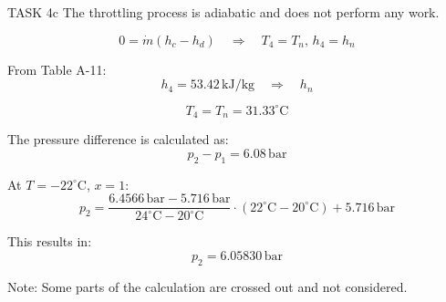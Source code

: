 TASK 4c  
The throttling process is adiabatic and does not perform any work.  

\[
0 = \dot{m} \left( h_c - h_d \right) \quad \Rightarrow \quad T_4 = T_n, \, h_4 = h_n
\]

From Table A-11:  
\[
h_4 = 53.42 \, \text{kJ/kg} \quad \Rightarrow \quad h_n
\]

\[
T_4 = T_n = 31.33^\circ\text{C}
\]

The pressure difference is calculated as:  
\[
p_2 - p_1 = 6.08 \, \text{bar}
\]

At \( T = -22^\circ\text{C} \), \( x = 1 \):  
\[
p_2 = \frac{6.4566 \, \text{bar} - 5.716 \, \text{bar}}{24^\circ\text{C} - 20^\circ\text{C}} \cdot (22^\circ\text{C} - 20^\circ\text{C}) + 5.716 \, \text{bar}
\]

This results in:  
\[
p_2 = 6.05830 \, \text{bar}
\]  

Note: Some parts of the calculation are crossed out and not considered.